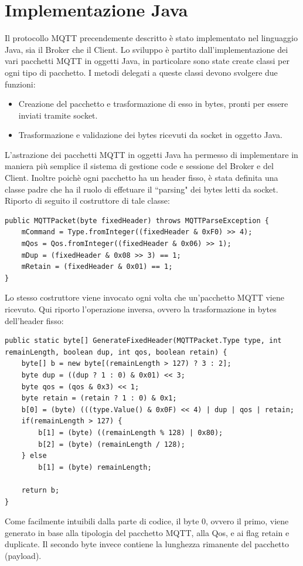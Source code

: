 \documentclass{article}
\begin{document}
\section{Implementazione Java}
Il protocollo MQTT precendemente descritto è stato implementato nel linguaggio Java, sia il Broker che il Client. Lo sviluppo è partito dall'implementazione dei vari pacchetti MQTT in oggetti Java, in particolare sono state create classi per ogni tipo di pacchetto. I metodi delegati a queste classi devono svolgere due funzioni:
\begin{itemize}
	\item Creazione del pacchetto e trasformazione di esso in bytes, pronti per essere inviati tramite socket.
	\item Trasformazione e validazione dei bytes ricevuti da socket in oggetto Java.
\end{itemize}
L'astrazione dei pacchetti MQTT in oggetti Java ha permesso di implementare in maniera più semplice il sistema di gestione code e sessione del Broker e del Client. Inoltre poichè ogni pacchetto ha un header fisso, è stata definita una classe padre che ha il ruolo di effetuare il ``parsing" dei bytes letti da socket. Riporto di seguito il costruttore di tale classe:
\begin{lstlisting}[style=JavaStyle]
public MQTTPacket(byte fixedHeader) throws MQTTParseException {
	mCommand = Type.fromInteger((fixedHeader & 0xF0) >> 4);
	mQos = Qos.fromInteger((fixedHeader & 0x06) >> 1);
	mDup = (fixedHeader & 0x08 >> 3) == 1;
	mRetain = (fixedHeader & 0x01) == 1;
}
\end{lstlisting}
Lo stesso costruttore viene invocato ogni volta che un'pacchetto MQTT viene ricevuto. Qui riporto l'operazione inversa, ovvero la trasformazione in bytes dell'header fisso:
\begin{lstlisting}[style=JavaStyle]
public static byte[] GenerateFixedHeader(MQTTPacket.Type type, int remainLength, boolean dup, int qos, boolean retain) {
	byte[] b = new byte[(remainLength > 127) ? 3 : 2];
	byte dup = ((dup ? 1 : 0) & 0x01) << 3;
	byte qos = (qos & 0x3) << 1;
	byte retain = (retain ? 1 : 0) & 0x1;
	b[0] = (byte) (((type.Value() & 0x0F) << 4) | dup | qos | retain;
	if(remainLength > 127) {
		b[1] = (byte) ((remainLength % 128) | 0x80);
		b[2] = (byte) (remainLength / 128);
	} else
		b[1] = (byte) remainLength;
	
	return b;
}
\end{lstlisting}
Come facilmente intuibili dalla parte di codice, il byte 0, ovvero il primo, viene generato in base alla tipologia del pacchetto MQTT, alla Qos, e ai flag retain e duplicate. Il secondo byte invece contiene la lunghezza rimanente del pacchetto (payload).\\\\
\end{document}
